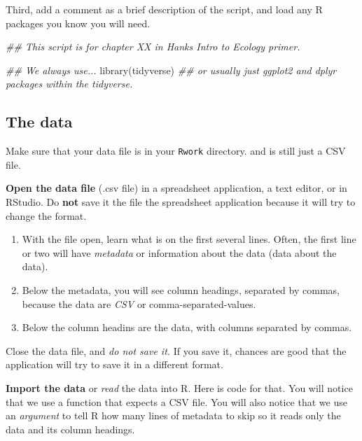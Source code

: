 \documentclass[
  letterpaper,
  DIV=11,
  numbers=noendperiod]{scrreprt}
\newenvironment{Shaded}{\begin{snugshade}}{\end{snugshade}}
\newcommand{\DocumentationTok}[1]{\textcolor[rgb]{0.37,0.37,0.37}{\textit{#1}}}
\newcommand{\FunctionTok}[1]{\textcolor[rgb]{0.28,0.35,0.67}{#1}}
\newcommand{\NormalTok}[1]{\textcolor[rgb]{0.00,0.23,0.31}{#1}}
\providecommand{\tightlist}{%
  \setlength{\itemsep}{0pt}\setlength{\parskip}{0pt}}
\begin{document}
Third, add a comment as a brief description of the script, and load any
R packages you know you will need.

\begin{Shaded}
\begin{Highlighting}[]
\DocumentationTok{\#\# This script is for chapter XX in Hank\textquotesingle{}s Intro to Ecology primer.}

\DocumentationTok{\#\# We always use...}
\FunctionTok{library}\NormalTok{(tidyverse)}
\DocumentationTok{\#\# or usually just ggplot2 and dplyr packages within the tidyverse.}
\end{Highlighting}
\end{Shaded}

\subsection{The data}\label{the-data}

Make sure that your data file is in your \texttt{Rwork} directory. and
is still just a CSV file.

\textbf{Open the data file} (.csv file) in a spreadsheet application, a
text editor, or in RStudio. Do \textbf{not} save it the file the
spreadsheet application because it will try to change the format.

\begin{enumerate}
\def\labelenumi{\arabic{enumi}.}
\tightlist
\item
  With the file open, learn what is on the first several lines. Often,
  the first line or two will have \emph{metadata} or information about
  the data (data about the data).
\item
  Below the metadata, you will see column headings, separated by commas,
  because the data are \emph{CSV} or comma-separated-values.
\item
  Below the column headins are the data, with columns separated by
  commas.
\end{enumerate}

Close the data file, and \emph{do not save it.} If you save it, chances
are good that the application will try to save it in a different format.

\textbf{Import the data} or \emph{read} the data into R. Here is code
for that. You will notice that we use a function that expects a CSV
file. You will also notice that we use an \emph{argument} to tell R how
many lines of metadata to skip so it reads only the data and its column
headings.
\end{document}
